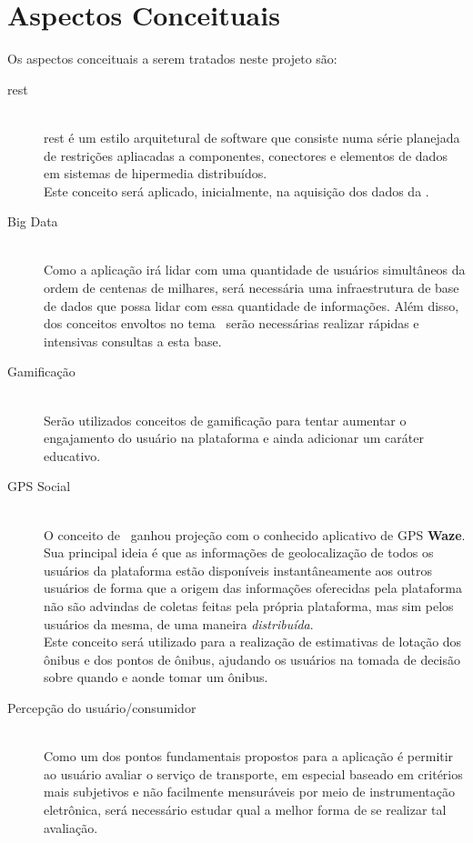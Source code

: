 \chapter{Aspectos Conceituais}\label{chp:aspectosConceituais}

Os aspectos conceituais a serem tratados neste projeto são:
\begin{description}
	\item[\gls{rest}] \cite{Fielding2000} \hfill \\
	    \gls{rest} é um estilo arquitetural de software que consiste numa série planejada de restrições apliacadas a componentes, conectores e elementos de dados em sistemas de hipermedia distribuídos. \\
	    Este conceito será aplicado, inicialmente, na aquisição dos dados da \sptrans.
	\item[Big Data] \hfill \\
	    Como a aplicação irá lidar com uma quantidade de usuários simultâneos da ordem de centenas de milhares, será necessária uma infraestrutura de base de dados que possa lidar com essa quantidade de informações. Além disso, dos conceitos envoltos no tema \bigdata~serão necessárias realizar rápidas e intensivas consultas a esta base.
	\item[Gamificação] \cite{vieira2012exploratory,Mastrocola2012} \hfill \\
	    Serão utilizados conceitos de gamificação para tentar aumentar o engajamento do usuário na plataforma e ainda adicionar um caráter educativo.
	\item[GPS Social]\cite{Miller2013,Gal-Tzur2014a,Filippi2013,Gal-Tzur2014,Nunes2014} \hfill \\
	    O conceito de \gpssocial~ganhou projeção com o conhecido aplicativo de GPS \textbf{Waze}. Sua principal ideia é que as informações de geolocalização de todos os usuários da plataforma estão disponíveis instantâneamente aos outros usuários de forma que a origem das informações oferecidas pela plataforma não são advindas de coletas feitas pela própria plataforma, mas sim pelos usuários da mesma, de uma maneira \textit{distribuída}. \\
	    Este conceito será utilizado para a realização de estimativas de lotação dos ônibus e dos pontos de ônibus, ajudando os usuários na tomada de decisão sobre quando e aonde tomar um ônibus.
	\item[Percepção do usuário/consumidor]\cite{Lai1995,Almeida2011,Almeida2007,andrade2008constructos} \hfill \\
	    Como um dos pontos fundamentais propostos para a aplicação é permitir ao usuário avaliar o serviço de transporte, em especial baseado em critérios mais subjetivos e não facilmente mensuráveis por meio de instrumentação eletrônica, será necessário estudar qual a melhor forma de se realizar tal avaliação.
\end{description}

